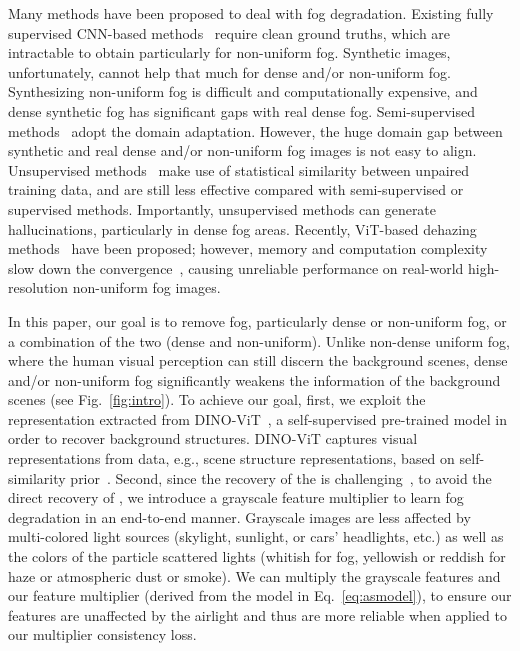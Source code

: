 \documentclass[runningheads]{llncs}
\begin{document}
Many methods have been proposed to deal with fog degradation.
Existing fully supervised CNN-based methods~\cite{cai2016dehazenet,li2017aod,zhang2018densely,qu2019enhanced,liu2019griddehazenet,dong2020multi,wu2021contrastive} require clean ground truths, which are intractable to obtain particularly for non-uniform fog.
Synthetic images, unfortunately, cannot help that much for dense and/or non-uniform fog. Synthesizing non-uniform fog is difficult and computationally expensive, and dense synthetic fog has significant gaps with real dense fog.
Semi-supervised methods~\cite{li2019semi,shao2020domain,chen2021psd,li2022physically} adopt the domain adaptation. However, the huge domain gap between synthetic and real dense and/or non-uniform fog images is not easy to align.
Unsupervised methods~\cite{huang2019towards,golts2019unsupervised,li2021you,zhao2021refinednet,yang2022self} make use of statistical similarity between unpaired training data,  and are still less effective compared with semi-supervised or supervised methods. Importantly, unsupervised methods can generate hallucinations, particularly in dense fog areas.
Recently, ViT-based dehazing methods~\cite{guo2022image,song2022vision} have been proposed; however, memory and computation complexity slow down the convergence~\cite{zhu2020deformable}, causing unreliable performance on real-world high-resolution non-uniform fog images.


In this paper, our goal is to remove fog, particularly dense or non-uniform fog, or a combination of the two (dense and non-uniform).
Unlike non-dense uniform fog, where the human visual perception can still discern the background scenes, dense and/or non-uniform fog significantly weakens the information of the background scenes (see Fig.~\ref{fig:intro}).
To achieve our goal, first, we exploit the representation extracted from DINO-ViT~\cite{caron2021emerging}, a self-supervised pre-trained model in order to recover background structures.
DINO-ViT captures visual representations from data, e.g., scene structure representations, based on self-similarity prior~\cite{shechtman2007matching}.
Second, since the recovery of the  is challenging~\cite{Sulami2014}, to avoid the direct recovery of , we introduce a grayscale feature multiplier to learn fog degradation in an end-to-end manner.
Grayscale images are less affected by multi-colored light sources (skylight, sunlight, or cars' headlights, etc.) as well as the colors of the particle scattered lights (whitish for fog, yellowish or reddish for haze or atmospheric dust or smoke).
We can multiply the grayscale features and our feature multiplier (derived from the model in Eq.~\eqref{eq:asmodel}), to ensure our features are unaffected by the airlight and thus are more reliable when applied to our multiplier consistency loss.
\end{document}
